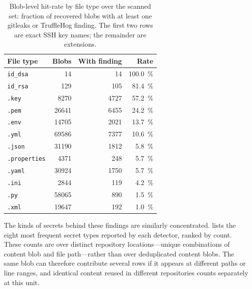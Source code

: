 \begin{table}[h]
\centering
\caption{Blob-level hit-rate by file type over the scanned set: fraction of recovered blobs with at least one gitleaks or TruffleHog finding. The first two rows are exact SSH key names; the remainder are extensions.}
\label{tab:sec-ext-hitrate}
\small
\begin{tabular}{lrrr}
\hline
\textbf{File type} & \textbf{Blobs} & \textbf{With finding} & \textbf{Rate} \\
\hline
\texttt{id\_dsa}     & \num{14}    & \num{14}   & \SI{100.0}{\percent} \\
\texttt{id\_rsa}     & \num{129}   & \num{105}  & \SI{81.4}{\percent}  \\
\texttt{.key}        & \num{8270}  & \num{4727} & \SI{57.2}{\percent}  \\
\texttt{.pem}        & \num{26641} & \num{6455} & \SI{24.2}{\percent}  \\
\texttt{.env}        & \num{14705} & \num{2021} & \SI{13.7}{\percent}  \\
\texttt{.yml}        & \num{69586} & \num{7377} & \SI{10.6}{\percent}  \\
\texttt{.json}       & \num{31190} & \num{1812} & \SI{5.8}{\percent}   \\
\texttt{.properties} & \num{4371}  & \num{248}  & \SI{5.7}{\percent}   \\
\texttt{.yaml}       & \num{30924} & \num{1750} & \SI{5.7}{\percent}   \\
\texttt{.ini}        & \num{2844}  & \num{119}  & \SI{4.2}{\percent}   \\
\texttt{.py}         & \num{58065} & \num{890}  & \SI{1.5}{\percent}   \\
\texttt{.xml}        & \num{19647} & \num{192}  & \SI{1.0}{\percent}   \\
\hline
\end{tabular}
\end{table}

The kinds of secrets behind these findings are similarly concentrated.
 lists the eight most frequent secret types reported by each detector, ranked by count.
These counts are over distinct repository locations---unique combinations of content blob and file path---rather than over deduplicated content blobs.
The same blob can therefore contribute several rows if it appears at different paths or line ranges, and identical content reused in different repositories counts separately at this unit.

